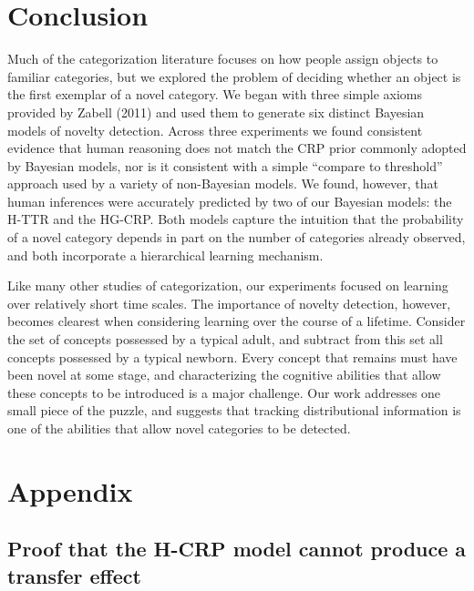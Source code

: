 \documentclass[doc]{apa6}
\begin{document}
\section{Conclusion}


Much of the categorization literature focuses on how people assign objects to familiar categories, but we explored the problem of deciding whether an object is the first exemplar of a novel category.  We began with three simple axioms provided by Zabell (2011) and used them to generate six distinct Bayesian models of novelty detection. Across three experiments we found consistent evidence that human reasoning does not match the CRP prior commonly adopted by Bayesian models, nor is it consistent with a simple ``compare to threshold'' approach used by a variety of non-Bayesian models. We found, however, that human inferences were accurately predicted by two of our Bayesian models: the H-TTR and the HG-CRP. Both models capture the intuition that the probability of a novel category depends in part on the number of categories already observed, and both incorporate a hierarchical learning mechanism.

Like many other studies of categorization, our experiments focused on learning over relatively short time scales. The importance of novelty detection, however, becomes clearest when considering learning over the course of a lifetime. Consider the set of concepts possessed by a typical adult, and subtract from this set all concepts possessed by a typical newborn. Every concept that remains must have been novel at some stage, and characterizing the cognitive abilities that allow these concepts to be introduced is a major challenge. Our work addresses one small piece of the puzzle, and suggests that tracking distributional information is one of the abilities that allow novel categories to be detected.




\section{Appendix}

\subsection{Proof that the H-CRP model cannot produce a transfer effect}
\end{document}
